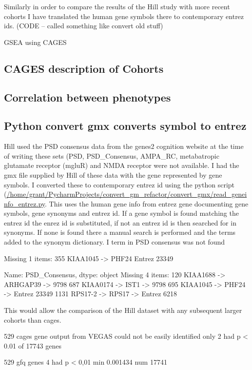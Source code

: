 Similarly in order to compare the results of the Hill study with more recent cohorts I have translated the human gene symbols there to contemporary entrez ids. (CODE – called something like convert old stuff)

GSEA using CAGES

\subsection{CAGES description of Cohorts}

\subsection{Correlation between phenotypes}

\subsection{Python convert gmx converts symbol to entrez}
Hill used the PSD consensus data from the genes2 cognition website at the time of writing these sets (PSD, PSD\_Consensus, AMPA\_RC, metabatropic glutamate receptor (mgluR) and NMDA receptor were not available. I had the gmx file supplied by Hill of these data with the gene represented by gene symbols. I converted these to contemporary entrez id using the python script (\url{/home/grant/PycharmProjects/convert_gm_refactor/convert_gmx/read_geneinfo_entrez.py}.
This uses the human gene info from entrez gene documenting gene symbols, gene synonyms and entrez id. If a gene symbol is found matching the entrez id the enrez id is substituted, if not an entrez id is then searched for in synonyms. If none is found there a manual search is performed and the terms added to the synonym dictionary. I term in PSD consensus was not found

Missing 1 items: 355    KIAA1045 -> PHF24 Entrez 23349


Name: PSD\_Consensus, dtype: object
Missing 4 items: 120     KIAA1688 -> ARHGAP39 -> 9798
687     KIAA0174 -> IST1 -> 9798
695     KIAA1045 -> PHF24 -> Entrez 23349
1131     RPS17-2 -> RPS17 -> Entrez 6218

This would allow the comparison of the Hill dataset with any subsequent larger cohorts than cages. 

529 cages gene output from VEGAS could not be easily identified only 2 had p < 0.01 of 17743 genes

529 gfq genes 4 had p < 0,01 min 0.001434  num 17741


